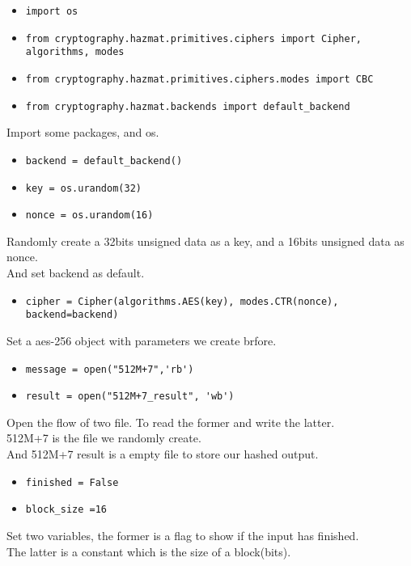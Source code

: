 \documentclass{article}
\begin{document}
\begin{itemize}
\item \verb|import os|
\item \verb|from cryptography.hazmat.primitives.ciphers import Cipher, algorithms, modes|
\item \verb|from cryptography.hazmat.primitives.ciphers.modes import CBC|
\item \verb|from cryptography.hazmat.backends import default_backend|
\end{itemize}

\noindent Import some packages, and os.

\begin{itemize}
\item \verb|backend = default_backend()|
\item \verb|key = os.urandom(32)|
\item \verb|nonce = os.urandom(16)|
\end{itemize}

\noindent Randomly create a 32bits unsigned data as a key, and a 16bits unsigned data as nonce.\\
And set backend as default.

\begin{itemize}
\item \verb|cipher = Cipher(algorithms.AES(key), modes.CTR(nonce), backend=backend)|
\end{itemize}

\noindent Set a aes-256 object with parameters we create brfore.

\begin{itemize}
\item \verb|message = open("512M+7",'rb')|
\item \verb|result = open("512M+7_result", 'wb')|
\end{itemize}
 
\noindent Open the flow of two file. To read the former and write the latter.\\
512M+7 is the file we randomly create.\\
And 512M+7 result is a empty file to store our hashed output.

\begin{itemize}
\item \verb|finished = False|
\item \verb|block_size =16|
\end{itemize}

\noindent Set two variables, the former is a flag to show if the input has finished.\\
The latter is a constant which is the size of a block(bits).
\end{document}

